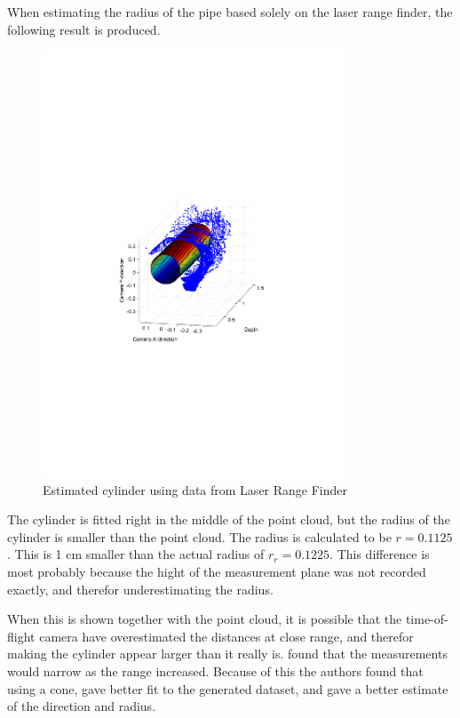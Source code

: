 When estimating the radius of the pipe based solely on the laser range finder, the
following result is produced. 
\begin{figure}[htbp]
    \centering
    \includegraphics[width=0.8\textwidth]{pics/longpipe-urg-3d}
    \caption{Estimated cylinder using data from Laser Range Finder}
    \label{chap8:fig-longpipe-urg-3d}
\end{figure}
The cylinder is fitted right in the middle of the point cloud, but the radius of the
cylinder is smaller than the point cloud. The radius is calculated to be $r = 0.1125$. This
is 1 cm smaller than the actual radius of $r_r = 0.1225$. This difference is most
probably because the hight of the measurement plane was not recorded exactly, and therefor
underestimating the radius. 

When this is shown together with the point cloud, it is
possible that the time-of-flight camera have overestimated the distances at close range,
and therefor making the cylinder appear larger than it really is. \cite{sintef-tof} found
that the measurements would narrow as the range increased. Because of this the authors
found that using a cone, gave better fit to the generated dataset, and gave a better
estimate of the direction and radius. 


